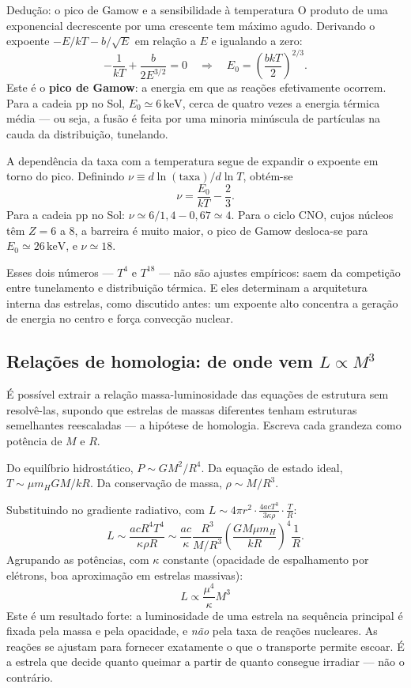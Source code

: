 \documentclass[11pt,a4paper]{article}
\begin{document}
\begin{lessonblock}[borderline west={2pt}{0pt}{astroGold}]{Dedução: o pico de Gamow e a sensibilidade à temperatura}
O produto de uma exponencial decrescente por uma crescente tem máximo agudo. Derivando o expoente $-E/kT-b/\sqrt{E}$ em relação a $E$ e igualando a zero:
\[
-\frac{1}{kT}+\frac{b}{2E^{3/2}}=0
\quad\Longrightarrow\quad
E_0=\left(\frac{bkT}{2}\right)^{2/3}.
\]
Este é o \textbf{pico de Gamow}: a energia em que as reações efetivamente ocorrem. Para a cadeia pp no Sol, $E_0\simeq6\,\mathrm{keV}$, cerca de quatro vezes a energia térmica média --- ou seja, a fusão é feita por uma minoria minúscula de partículas na cauda da distribuição, tunelando.

A dependência da taxa com a temperatura segue de expandir o expoente em torno do pico. Definindo $\nu\equiv d\ln(\text{taxa})/d\ln T$, obtém-se
\[
\nu=\frac{E_0}{kT}-\frac{2}{3}.
\]
Para a cadeia pp no Sol: $\nu\simeq6/1{,}4-0{,}67\simeq4$. Para o ciclo CNO, cujos núcleos têm $Z=6$ a $8$, a barreira é muito maior, o pico de Gamow desloca-se para $E_0\simeq26\,\mathrm{keV}$, e $\nu\simeq18$.

Esses dois números --- $T^{4}$ e $T^{18}$ --- não são ajustes empíricos: saem da competição entre tunelamento e distribuição térmica. E eles determinam a arquitetura interna das estrelas, como discutido antes: um expoente alto concentra a geração de energia no centro e força convecção nuclear.
\end{lessonblock}

\subsection*{Relações de homologia: de onde vem $L\propto M^{3}$}

É possível extrair a relação massa-luminosidade das equações de estrutura sem resolvê-las, supondo que estrelas de massas diferentes tenham estruturas semelhantes reescaladas --- a hipótese de homologia. Escreva cada grandeza como potência de $M$ e $R$.

Do equilíbrio hidrostático, $P\sim GM^{2}/R^{4}$. Da equação de estado ideal, $T\sim\mu m_HGM/kR$. Da conservação de massa, $\rho\sim M/R^{3}$.

Substituindo no gradiente radiativo, com $L\sim4\pi r^{2}\cdot\frac{4acT^{3}}{3\kappa\rho}\cdot\frac{T}{R}$:
\[
L\sim\frac{acR^{4}T^{4}}{\kappa\rho R}
\sim\frac{ac}{\kappa}\frac{R^{3}}{M/R^{3}}\left(\frac{GM\mu m_H}{kR}\right)^{4}\frac{1}{R}.
\]
Agrupando as potências, com $\kappa$ constante (opacidade de espalhamento por elétrons, boa aproximação em estrelas massivas):
\[
\boxed{\ L\propto\frac{\mu^{4}}{\kappa}M^{3}\ }
\]
Este é um resultado forte: a luminosidade de uma estrela na sequência principal é fixada pela massa e pela opacidade, e \emph{não} pela taxa de reações nucleares. As reações se ajustam para fornecer exatamente o que o transporte permite escoar. É a estrela que decide quanto queimar a partir de quanto consegue irradiar --- não o contrário.
\end{document}
